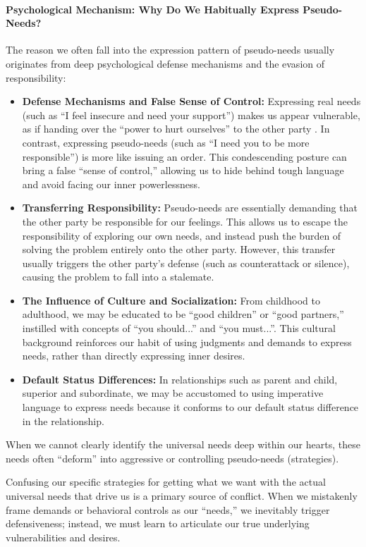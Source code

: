 \paragraph{Psychological Mechanism: Why Do We Habitually Express Pseudo-Needs?}
The reason we often fall into the expression pattern of pseudo-needs usually
originates from deep psychological defense mechanisms and the evasion of
responsibility:
\begin{itemize}
    \item \textbf{Defense Mechanisms and False Sense of Control:} Expressing
    real needs (such as ``I feel insecure and need your support'') makes us
    appear vulnerable, as if handing over the ``power to hurt ourselves''
    to the other party \citep{lazarus1991}.
    In contrast, expressing pseudo-needs (such as ``I need you to be more
    responsible'') is more like issuing an order.
    This condescending posture can bring a false ``sense of control,''
    allowing us to hide behind tough language and avoid facing our inner
    powerlessness.
    \item \textbf{Transferring Responsibility:} Pseudo-needs are essentially
    demanding that the other party be responsible for our feelings.
    This allows us to escape the responsibility of exploring our own needs,
    and instead push the burden of solving the problem entirely onto the
    other party.
    However, this transfer usually triggers the other party's defense
    (such as counterattack or silence), causing the problem to fall into a
    stalemate.
    \item \textbf{The Influence of Culture and Socialization:} From childhood
    to adulthood, we may be educated to be ``good children'' or ``good
    partners,'' instilled with concepts of ``you should...'' and ``you
    must...''.
    This cultural background reinforces our habit of using judgments and
    demands to express needs, rather than directly expressing inner desires.
    \item \textbf{Default Status Differences:} In relationships such as
    parent and child, superior and subordinate, we may be accustomed to
    using imperative language to express needs because it conforms to our
    default status difference in the relationship.
\end{itemize}

When we cannot clearly identify the universal needs deep within our hearts,
these needs often ``deform'' into aggressive or controlling pseudo-needs
(strategies).

\begin{keyinsight}
Confusing our specific strategies for getting what we want with the actual
universal needs that drive us is a primary source of conflict.
When we mistakenly frame demands or behavioral controls as our ``needs,''
we inevitably trigger defensiveness; instead, we must learn to articulate
our true underlying vulnerabilities and desires.
\end{keyinsight}
